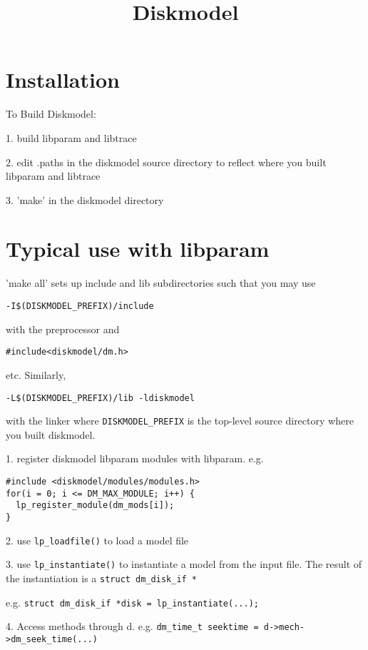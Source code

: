 \documentclass{article}
\begin{document}
\title{Diskmodel}
\maketitle







\section{Installation}
To Build Diskmodel:

1.  build libparam and libtrace 

2.  edit .paths in the diskmodel source directory to reflect where
you built libparam and libtrace

3.  'make' in the diskmodel directory

\section{Typical use with libparam}

'make all' sets up include and lib subdirectories such that
you may use 
\begin{verbatim}-I$(DISKMODEL_PREFIX)/include \end{verbatim}
with the preprocessor and 
\begin{verbatim}#include<diskmodel/dm.h> \end{verbatim} etc.  Similarly, 
\begin{verbatim}-L$(DISKMODEL_PREFIX)/lib -ldiskmodel \end{verbatim} 
with the linker where \texttt{DISKMODEL\_PREFIX} is the top-level
source directory where you built diskmodel.


1.  register diskmodel libparam modules with libparam. e.g.
\begin{verbatim}
#include <diskmodel/modules/modules.h>
for(i = 0; i <= DM_MAX_MODULE; i++) {
  lp_register_module(dm_mods[i]);
}
\end{verbatim}

2.  use \texttt{lp\_loadfile()} to load a model file

3.  use \texttt{lp\_instantiate()} to instantiate a model from the
input file.  The result of the instantiation is a \texttt{struct
dm\_disk\_if *}

e.g. \texttt{struct dm\_disk\_if *disk = lp\_instantiate(...);}


4.  Access methods through d.
e.g. \texttt{dm\_time\_t seektime = d->mech->dm\_seek\_time(...)}



\end{document}
